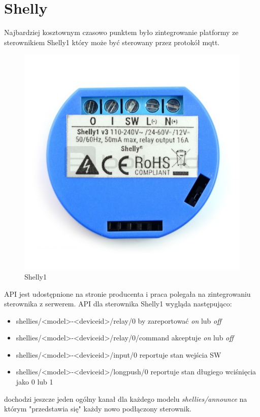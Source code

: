 \section{Shelly}
Najbardziej kosztownym czasowo punktem było zintegrowanie platformy ze sterownikiem Shelly1 który może być sterowany przez protokół mqtt. 
\begin{figure}[h]
  \includegraphics[width=\linewidth]{shelly1.jpg}
  \caption{Shelly1}
  \label{fig:shelly}
\end{figure}
API jest udostępnione na stronie producenta i praca polegała na zintegrowaniu sterownika z serwerem.
API dla sterownika Shelly1 wygląda następująco:
\begin{itemize}
    \item shellies/<model>-<deviceid>/relay/0 by zareportować \textit{on} lub \textit{off}
    \item shellies/<model>-<deviceid>/relay/0/command akceptuje \textit{on} lub \textit{off}
    \item shellies/<model>-<deviceid>/input/0 reportuje stan wejścia SW
    \item shellies/<model>-<deviceid>/longpush/0 reportuje stan długiego wciśnięcia jako 0 lub 1
\end{itemize}
dochodzi jeszcze jeden ogólny kanał dla każdego modelu \textit{shellies/announce} na którym "przedstawia się" każdy nowo podłączony sterownik.

